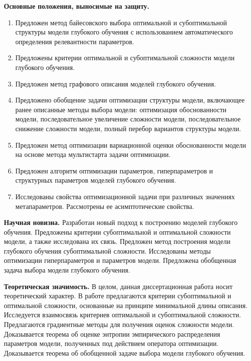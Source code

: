 \documentclass[11pt, a5paper]{dissert}
\theoremstyle{definition}
\begin{document}
\vspace{0.5cm}
\textbf{Основные положения, выносимые на защиту.}
\vspace{0.3cm}
\begin{enumerate}
\item Предложен метод байесовского выбора оптимальной и субоптимальной структуры модели глубокого обучения с использованием автоматического определения
релевантности параметров.
\item Предложены критерии оптимальной и субоптимальной сложности модели глубокого обучения.
\item Предложен метод графового описания моделей глубокого обучения.
\item Предложено обобщение задачи оптимизации структуры модели, включающее ранее описанные методы выбора модели: оптимизация обоснованности модели, последовательное увеличение сложности модели, последовательное снижение сложности модели, полный перебор вариантов структуры модели.
\item Предложен метод оптимизации вариационной оценки обоснованности модели на основе метода мультистарта задачи оптимизации.
\item Предложен алгоритм оптимизации параметров, гиперпараметров и структурных параметров моделей глубокого обучения.
\item Исследованы свойства оптимизационной задачи при различных значениях метапараметров. Рассмотрены ее асимптотические свойства.
\end{enumerate}


\vspace{0.5cm}
\textbf{Научная новизна.} Разработан новый подход к построению моделей глубокого обучения. Предложены критерии субоптимальной и оптимальной сложности модели, а также исследована их связь. Предложен метод построения модели глубокого обучения субоптимальной сложности. Исследованы методы оптимизации гиперпараметров и параметров модели.  Предложена обобщенная задача выбора модели глубокого обучения.

\vspace{0.5cm}
\textbf{Теоретическая значимость.} В целом, данная диссертационная работа носит теоретический характер. В работе предлагаются критерии субоптимальной и оптимальной сложности, основанные на принципе минимальной длины описания. Исследуется взаимосвязь критериев оптимальной и субоптимальной сложности. Предлагаются градиентные методы для получения оценок сложности модели. Доказывается теорема об оценке энтропии эмпирического распределения параметров модели, полученных под действием оператора оптимизации.
Доказывается теорема об обобщенной задаче выбора модели глубокого обучения.
\end{document}
